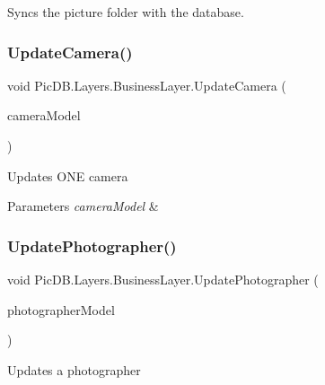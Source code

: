 Syncs the picture folder with the database. 

\mbox{\label{class_pic_d_b_1_1_layers_1_1_business_layer_a6d69eb6022d1127b86902ed4f478f2f5}} 
\subsubsection{\texorpdfstring{Update\+Camera()}{UpdateCamera()}}
{\footnotesize\ttfamily void Pic\+D\+B.\+Layers.\+Business\+Layer.\+Update\+Camera (\begin{DoxyParamCaption}\item[{I\+Camera\+Model}]{camera\+Model }\end{DoxyParamCaption})}



Updates O\+NE camera 


\begin{DoxyParams}{Parameters}
{\em camera\+Model} & \\
\hline
\end{DoxyParams}
\mbox{\label{class_pic_d_b_1_1_layers_1_1_business_layer_a0475835841490a4b7b6af5e36c4d4b50}} 
\subsubsection{\texorpdfstring{Update\+Photographer()}{UpdatePhotographer()}}
{\footnotesize\ttfamily void Pic\+D\+B.\+Layers.\+Business\+Layer.\+Update\+Photographer (\begin{DoxyParamCaption}\item[{\mbox{\hyperlink{class_pic_d_b_1_1_models_1_1_photographer_model}{Photographer\+Model}}}]{photographer\+Model }\end{DoxyParamCaption})}



Updates a photographer 


